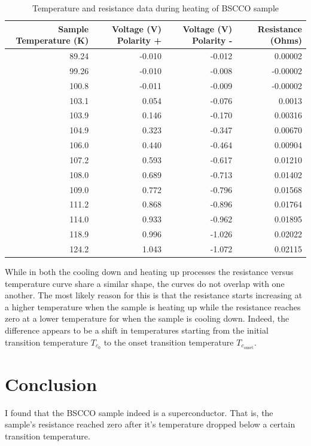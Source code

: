 \documentclass[12pt]{article}
\begin{document}
\begin{table}[htbp]
\caption{Temperature and resistance data during heating of BSCCO sample}
\centering
\begin{tabular}{rrrr}
Sample Temperature (K) & Voltage (V) Polarity + & Voltage (V) Polarity - & Resistance (Ohms)\\
\hline
89.24 & -0.010 & -0.012 & 0.00002\\
99.26 & -0.010 & -0.008 & -0.00002\\
100.8 & -0.011 & -0.009 & -0.00002\\
103.1 & 0.054 & -0.076 & 0.0013\\
103.9 & 0.146 & -0.170 & 0.00316\\
104.9 & 0.323 & -0.347 & 0.00670\\
106.0 & 0.440 & -0.464 & 0.00904\\
107.2 & 0.593 & -0.617 & 0.01210\\
108.0 & 0.689 & -0.713 & 0.01402\\
109.0 & 0.772 & -0.796 & 0.01568\\
111.2 & 0.868 & -0.896 & 0.01764\\
114.0 & 0.933 & -0.962 & 0.01895\\
118.9 & 0.996 & -1.026 & 0.02022\\
124.2 & 1.043 & -1.072 & 0.02115\\
\end{tabular}
\end{table}

While in both the cooling down and heating up processes the resistance versus temperature curve share a similar shape, the curves do not overlap with one another.
The most likely reason for this is that the resistance starts increasing at a higher temperature when the sample is heating up while the resistance reaches zero at a lower temperature for when the sample is cooling down.
Indeed, the difference appears to be a shift in temperatures starting from the initial transition temperature \(T_{c_0}\) to the onset transition temperature \(T_{c_{\text{onset}}}\).

\section*{Conclusion}
\label{sec:org65df817}

I found that the BSCCO sample indeed is a superconductor.
That is, the sample's resistance reached zero after it's temperature dropped below a certain transition temperature.


\printbibliography
\end{document}

